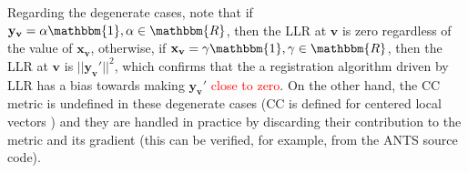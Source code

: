 Regarding the degenerate cases, note that if $\mathbf{y}_{\mathbf{v}} = \alpha \mathbbm{1}, \alpha\in \mathbbm{R}$, then the LLR at $\mathbf{v}$ is zero regardless of the value of $\mathbf{x}_{\mathbf{v}}$, otherwise, if $\mathbf{x}_{\mathbf{v}} = \gamma \mathbbm{1}, \gamma\in \mathbbm{R}$, then the LLR at $\mathbf{v}$ is $||\mathbf{y}_{\mathbf{v}}'||^{2}$, which confirms that the a registration algorithm driven by LLR has a bias towards making $\mathbf{y}_{\mathbf{v}}'$ \textcolor{red}{close to zero}. On the other hand, the CC metric is undefined in these degenerate cases (CC is defined for centered local vectors \cite{Avants2008}\cite{Avants2011}) and they are handled in practice by discarding their contribution to the metric and its gradient (this can be verified, for example, from the ANTS \cite{Avants2011a} source code).

